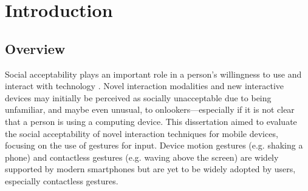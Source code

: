 \documentclass{l4proj}
\begin{document}
\tableofcontents
%
%
%
%
%
% 
%
%
\chapter{Introduction}



\section{Overview}
Social acceptability plays an important role in a person's willingness to use and interact with technology \citep{rico_usable_2010}. Novel interaction modalities and new interactive devices may initially be perceived as socially unacceptable due to being unfamiliar, and maybe even unusual, to onlookers---especially if it is not clear that a person is using a computing device. This dissertation aimed to evaluate the social acceptability of novel interaction techniques for mobile devices, focusing on the use of gestures for input. Device motion gestures (e.g. shaking a phone) and contactless gestures (e.g. waving above the screen) are widely supported by modern smartphones but are yet to be widely adopted by users, especially contactless gestures.
\end{document}
